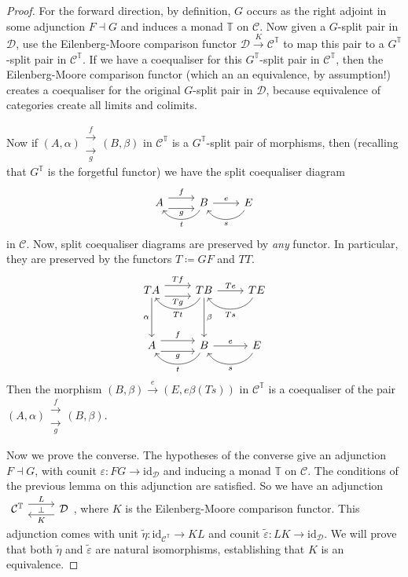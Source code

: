 \documentclass[a4paper,11pt]{article}
\theoremstyle{break_italics}
\theoremstyle{break_upright}
\theoremstyle{remark}
\newcommand{\id}{\mathrm{id}}
\newcommand{\C}{\mathcal{C}}
\newcommand{\D}{\mathcal{D}}
\begin{document}
\begin{proof}
	For the forward direction, by definition, $G$ occurs as the right adjoint in some adjunction $F \dashv G$ and induces a monad $\mathbb T$ on $\C$. Now given a $G$-split pair in $\D$, use the Eilenberg-Moore comparison functor $\D \xrightarrow{K} \C^{\mathbb T}$ to map this pair to a $G^{\mathbb T}$-split pair in $\C^{\mathbb T}$. If we have a coequaliser for this $G^{\mathbb T}$-split pair in $\C^{\mathbb T}$, then the Eilenberg-Moore comparison functor (which an an equivalence, by assumption!) creates a coequaliser for the original $G$-split pair in $\D$, because equivalence of categories create all limits and colimits.
	
	Now if $(A,\alpha) \substack{\xrightarrow{f} \\ \xrightarrow[g]{}} (B,\beta)$ in $\C^{\mathbb T}$ is a $G^{\mathbb T}$-split pair of morphisms, then (recalling that $G^{\mathbb T}$ is the forgetful functor) we have the split coequaliser diagram
\[
\begin{tikzcd}
A \arrow[r, "f", shift left=2] \arrow[r, "g"', shift right=2] & B \arrow[l, "t", bend left=60] \arrow[r, "e"] & E \arrow[l, "s", bend left=60]
\end{tikzcd}
\]
	in $\C$. Now, split coequaliser diagrams are preserved by \textit{any} functor. In particular, they are preserved by the functors $T \coloneqq GF$ and $TT$.
\[
\begin{tikzcd}
TA \arrow[dd, "\alpha"'] \arrow[r, "Tf", shift left=2] \arrow[r, "Tg"', shift right=2] & TB \arrow[dd, "\beta"] \arrow[r, "Te"] \arrow[l, "Tt", bend left=60] & TE \arrow[l, "Ts", bend left=60] \\
                                                                                       &                                                                      &                                  \\
A \arrow[r, "f", shift left=2] \arrow[r, "g"', shift right=2]                          & B \arrow[l, "t", bend left=60] \arrow[r, "e"]                        & E \arrow[l, "s", bend left=60]  
\end{tikzcd}
\]
Then the morphism $(B,\beta) \xrightarrow{e} (E, e\beta(Ts))$ in $\C^{\mathbb T}$ is a coequaliser of the pair $(A,\alpha) \substack{\xrightarrow{f} \\ \xrightarrow[g]{}} (B,\beta)$.

Now we prove the converse. The hypotheses of the converse give an adjunction $F \dashv G$, with counit $\varepsilon \colon FG \to \id_\D$ and inducing a monad $\mathbb T$ on $\C$. The conditions of the previous lemma on this adjunction are satisfied. So we have an adjunction $\begin{tikzcd}
	\C^{\mathbb T} & \D
	\arrow["\bot"{description}, draw=none, from=1-1, to=1-2]
	\arrow["L", shift left=2, from=1-1, to=1-2]
	\arrow["K", shift left=2, from=1-2, to=1-1]
\end{tikzcd}$, where $K$ is the Eilenberg-Moore comparison functor. This adjunction comes with unit $\tilde \eta \colon \id_{\C^{\mathbb T}} \to KL$ and counit $\tilde \varepsilon \colon LK \to \id_\D$. We will prove that both $\tilde \eta$ and $\tilde \varepsilon$ are natural isomorphisms, establishing that $K$ is an equivalence.


\end{proof}
\end{document}
